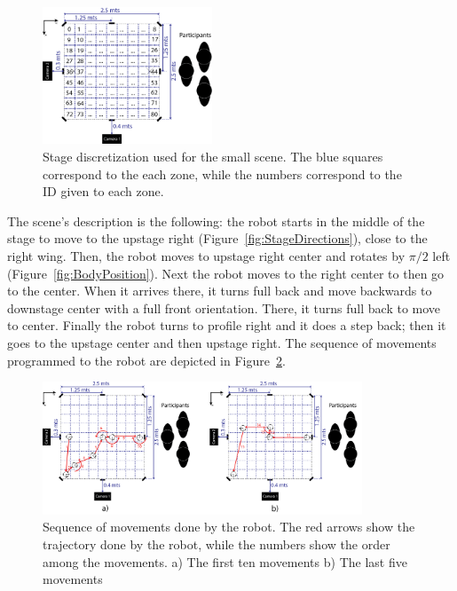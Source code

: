 \begin{figure}
	\centering
	\includegraphics[width=0.45\textwidth]{./Images/FourthCaseScene.png} 
	\caption{Stage discretization  used for the small scene. The blue squares correspond to the each zone, while the numbers correspond to the ID given to each zone.}
	\label{fig:stage_division}
\end{figure} 
The scene's description is the following: the robot starts in the middle of the stage to move to the upstage right (Figure~\ref{fig:StageDirections}), close to the right wing. Then, the robot moves to upstage right center and rotates by $\pi/2$ left (Figure~\ref{fig:BodyPosition}). Next the robot moves to the right center to then go to the center. When it arrives there, it turns full back and move backwards to downstage center with a full front orientation. There, it turns full back to move to center. Finally the robot turns to profile right and it does a step back; then it goes to the upstage center and then upstage right. The sequence of movements programmed to the robot are depicted in Figure~\ref{fig:movement}.
\begin{figure}
	\centering
	\includegraphics[width=0.85\textwidth]{./Images/fourthCaseSceneD.png} 
	\caption{Sequence of movements done by the robot. The red arrows show the trajectory done by the robot, while the numbers show the order among the movements. a) The first ten movements b) The last five movements }
	\label{fig:movement}
\end{figure}

